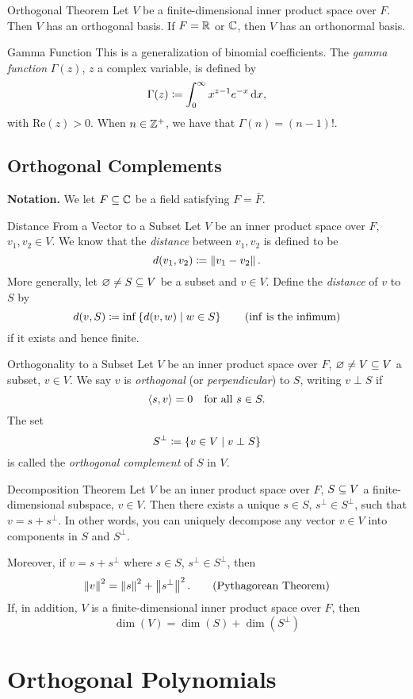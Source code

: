 \documentclass[class=article, crop=false]{standalone}
\begin{document}
  \begin{theorem}{Orthogonal Theorem}
    Let $V$ be a finite-dimensional inner product space over $F$. Then $V$ has an orthogonal basis. If $F = \mathbb{R}$ or $\mathbb{C}$, then $V$ has an orthonormal basis.
  \end{theorem}
  \begin{definition}{Gamma Function}
    This is a generalization of binomial coefficients. The \emph{gamma function} $\Gamma(z)$, $z$ a complex variable, is defined by 
    \[
      \Gamma(z)\coloneqq \int_{0}^{\infty}x^{z-1}e^{-x} \,\mathrm{d}x,
    \]
    with $\mathrm{Re}(z) > 0$. When $n\in \mathbb{Z}^+$, we have that $\Gamma(n) = (n-1)!$.
  \end{definition}
  \subsection{Orthogonal Complements}
  \textbf{Notation.} We let $F\subseteq \mathbb{C}$ be a field satisfying $F = \bar{F}$.
  \begin{definition}{Distance From a Vector to a Subset}
    Let $V$ be an inner product space over $F$, $v_1,v_2\in V$. We know that the \emph{distance} between $v_1,v_2$ is defined to be
    \[
      d(v_1,v_2)\coloneqq \left\lVert v_1-v_2\right\rVert.
    \]
    More generally, let $\varnothing\neq S\subseteq V$ be a subset and $v\in V$. Define the \emph{distance} of $v$ to $S$ by 
    \[
      d(v, S)\coloneqq \inf \left\{d(v, w)\mid w\in S\right\} \tag{$\inf$ is the infimum}
    \]
    if it exists and hence finite.
  \end{definition}
  \begin{definition}{Orthogonality to a Subset}
    Let $V$ be an inner product space over $F$, $\varnothing\neq V\subseteq V$ a subset, $v\in V$. We say $v$ is \emph{orthogonal} (or \emph{perpendicular}) to $S$, writing $v\perp S$ if 
    \[
      \left\langle s, v \right\rangle = 0 \quad\text{for all } s\in S. 
    \]
    The set
    \[
      S^\perp\coloneqq \left\{v\in V\mid v\perp S\right\}
    \]
    is called the \emph{orthogonal complement} of $S$ in $V$.
  \end{definition}
  \begin{theorem}{Decomposition Theorem}
    Let $V$ be an inner product space over $F$, $S\subseteq V$ a finite-dimensional subspace, $v\in V$. Then there exists a unique $s\in S$, $s^\perp\in S^\perp$, such that $v = s + s^\perp$. In other words, you can uniquely decompose any vector $v\in V$ into components in $S$ and $S^\perp$.\par
    Moreover, if $v = s + s^\perp$ where $s\in S$, $s^\perp\in S^\perp$, then
    \[
      \left\lVert v\right\rVert^2 = \left\lVert s\right\rVert^2 + \left\lVert s^\perp\right\rVert^2. \tag{Pythagorean Theorem}
    \]
    If, in addition, $V$ is a finite-dimensional inner product space over $F$, then
    \[
      \dim(V) = \dim(S) + \dim(S^\perp)
    \]
  \end{theorem}
  \section{Orthogonal Polynomials}
  
\end{document}
